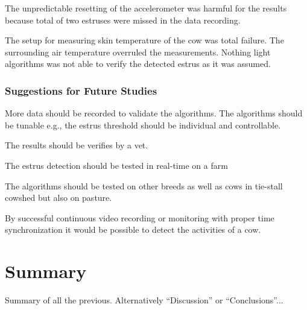 \documentclass[english,12pt,a4paper,pdftex,elec,utf8]{aaltothesis}
\begin{document}
The unpredictable resetting of the accelerometer was harmful for the results because total of two estruses were missed in the data recording.

The setup for measuring skin temperature of the cow was total failure. The surrounding air temperature overruled the measurements. Nothing light algorithms was not able to verify the detected estrus as it was assumed.

\subsubsection{Suggestions for Future Studies}

More data should be recorded to validate the algorithms. The algorithms should be tunable e.g., the estrus threshold should be individual and controllable.

The results should be verifies by a vet.

The estrus detection should be tested in real-time on a farm

The algorithms should be tested on other breeds as well as cows in tie-stall cowshed but also on pasture.

By successful continuous video recording or monitoring with proper time synchronization it would be possible to detect the activities of a cow. 


\clearpage

\section{Summary} \label{summarysection}


Summary of all the previous. Alternatively ``Discussion'' or ``Conclusions''...


\clearpage

\thesisbibliography

%



\printbibliography




\clearpage

\thesisappendix


\end{document}
